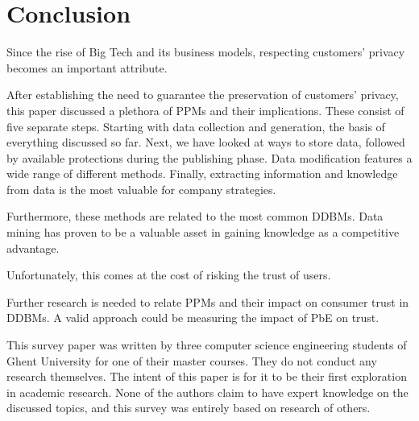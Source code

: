 \section{Conclusion}

Since the rise of Big Tech and its business models, respecting customers' privacy becomes an important attribute.

After establishing the need to guarantee the preservation of customers' privacy, this paper discussed a plethora of \gls{PPM}s and their implications. 
These consist of five separate steps. 
Starting with data collection and generation, the basis of everything discussed so far. 
Next, we have looked at ways to store data, followed by available protections during the publishing phase. 
Data modification features a wide range of different methods. Finally, extracting information and knowledge from data is the most valuable for company strategies.

Furthermore, these methods are related to the most common \gls{DDBM}s. Data mining has proven to be a valuable asset in gaining knowledge as a competitive advantage. 

Unfortunately, this comes at the cost of risking the trust of users.

Further research is needed to relate \gls{PPM}s and their impact on consumer trust in \gls{DDBM}s.
A valid approach could be measuring the impact of \gls{PbE} on trust.

This survey paper was written by three computer science engineering students of Ghent University for one of their master courses.
They do not conduct any research themselves.
The intent of this paper is for it to be their first exploration in academic research.
None of the authors claim to have expert knowledge on the discussed topics, 
and this survey was entirely based on research of others.
